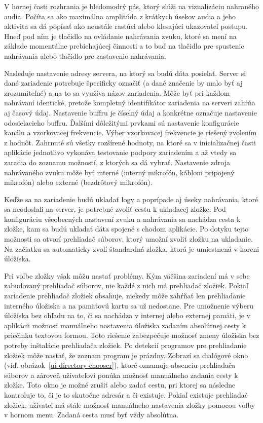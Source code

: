 V hornej časti rozhrania je bledomodrý pás, ktorý slúži na vizualizáciu nahraného audia. Počíta sa ako maximálna amplitúda z krátkych úsekov audia a jeho aktivita sa dá popísať ako neustále rastúci alebo klesajúci ukazovateľ postupu. Hneď pod ním je tlačidlo na ovládanie nahrávania zvuku, ktoré sa mení na základe momentálne prebiehajúcej činnosti a to buď na tlačidlo pre spustenie nahrávania alebo tlačidlo pre zastavenie nahrávania.

Nasleduje nastavenie adresy servera, na ktorý sa budú dáta posielať. Server si dané zariadenie potrebuje špecificky označiť (a dané značenie by malo byť aj zrozumiteľné) a na to sa využíva názov zariadenia. Môže byť pri každom nahrávaní identické, pretože kompletný identifikátor zariadenia na serveri zahŕňa aj časový údaj. Nastavenie buffru je číselný údaj a konkrétne označuje nastavenie odosielacieho buffru. Ďalšími dôležitými prvkami sú nastavenie konfigurácie kanálu a vzorkovacej frekvencie. Výber vzorkovacej frekvencie je riešený zvolením z hodnôt. Zahrnuté sú všetky rozšírené hodnoty, na ktoré sa v inicializačnej časti aplikácie jednotlivo vykonáva testovanie podpory zariadením a až vtedy sa zaradia do zoznamu možností, z ktorých sa dá vybrať. Nastavenie zdroja nahrávaného zvuku môže byť interné (interný mikrofón, káblom pripojený mikrofón) alebo externé (bezdrôtový mikrofón).

Keďže sa na zariadenie budú ukladať logy a poprípade aj úseky nahrávania, ktoré sa neodoslali na server, je potrebné zvoliť cestu k ukladacej zložke. Pod konfiguráciu všeobecných nastavení zvuku a nahrávania sa nachádza cesta k zložke, kam sa budú ukladať dáta spojené s chodom aplikácie. Po dotyku tejto možnosti sa otvorí prehliadač súborov, ktorý umožní zvoliť zložku na ukladanie. Na začiatku sa automaticky zvolí štandardná zložka, ktorá je umiestnená v koreni úložiska.

Pri voľbe zložky však môžu nastať problémy. Kým väčšina zariadení má v sebe zabudovaný prehliadač súborov, nie každé z nich má prehliadač zložiek. Pokiaľ zariadenie prehliadač zložiek obsahuje, niekedy môže zahŕňať len prehliadanie interného úložiska a na pamäťovú kartu sa už nedostane. Pre umožnenie výberu úložiska bez ohľadu na to, či sa nachádza v internej alebo externej pamäti, je v aplikácii možnosť manuálneho nastavenia úložiska zadaním absolútnej cesty k priečinku textovou formou. Toto riešenie zabezpečuje možnosť zmeny úložiska bez potreby inštalácie prehliadača zložiek. Po detekcií programov pre prehliadanie zložiek môže nastať, že zoznam program je prázdny. Zobrazí sa dialógové okno (viď. obrázok~\ref{ui-directory-chooser}), ktoré oznamuje absenciu prehliadača súborov a zároveň užívateľovi ponúka možnosť manuálneho zadania cesty k zložke. Toto okno je možné zrušiť alebo zadať cestu, pri ktorej sa následne kontroluje to, či je to skutočne adresár a či existuje. Pokiaľ existuje prehliadač zložiek, užívateľ má stále možnosť manuálneho nastavenia zložky pomocou voľby v hornom menu. Zadaná cesta musí byť vždy absolútna.

